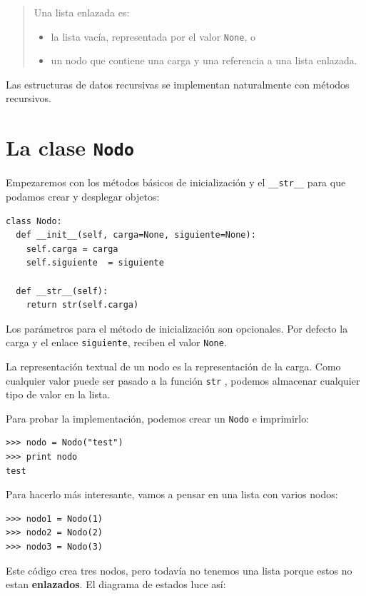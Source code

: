 \begin{quote}
Una lista enlazada es:
\begin{itemize}

\item la lista vacía, representada por el valor \texttt{None}, o

\item un nodo que contiene una carga y una referencia a una lista enlazada.

\end{itemize}

\end{quote}


Las estructuras de datos recursivas se implementan naturalmente con métodos
recursivos.


\section{La clase \texttt{Nodo} }

Empezaremos con los métodos básicos de inicialización y 
el  \texttt{\_\_str\_\_} para que podamos crear y desplegar 
objetos:

\beforeverb
\begin{verbatim}
class Nodo:
  def __init__(self, carga=None, siguiente=None):
    self.carga = carga
    self.siguiente  = siguiente

  def __str__(self):
    return str(self.carga)
\end{verbatim}
\afterverb
%
Los parámetros para el método de inicialización son opcionales. Por defecto
la carga y el enlace \texttt{siguiente}, reciben el valor \texttt{None}.

La representación textual de un nodo es la representación de la carga.
Como cualquier valor puede ser pasado a la función \texttt{str}
, podemos almacenar cualquier tipo de valor en la lista.

Para probar la implementación, podemos crear un  \texttt{Nodo}
e imprimirlo:

\beforeverb
\begin{verbatim}
>>> nodo = Nodo("test")
>>> print nodo
test
\end{verbatim}
\afterverb
%
Para hacerlo más interesante, vamos a pensar en una lista
con varios nodos:

\beforeverb
\begin{verbatim}
>>> nodo1 = Nodo(1)
>>> nodo2 = Nodo(2)
>>> nodo3 = Nodo(3)
\end{verbatim}
\afterverb
%
Este código crea tres nodos, pero todavía no tenemos una lista 
porque estos no estan {\bf enlazados}.  El diagrama de estados
luce así:

